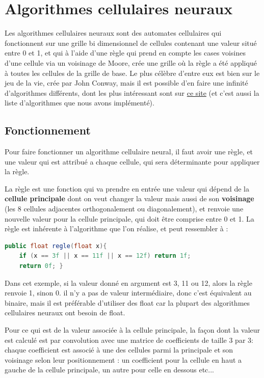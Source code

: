 \section{Algorithmes cellulaires neuraux}

\par Les algorithmes cellulaires neuraux sont des automates cellulaires qui fonctionnent sur une grille bi dimensionnel de cellules contenant une valeur situé entre 0 et 1, et qui à l'aide d'une règle qui prend en compte les cases voisines d'une cellule via un voisinage de Moore, crée une grille où la règle a été appliqué à toutes les cellules de la grille de base. Le plus célèbre d'entre eux est bien sur le jeu de la vie, crée par John Conway, mais il est possible d'en faire une infinité d'algorithmes différents, dont les plus intéressant sont sur \href{https://neuralpatterns.io/}{ce site} (et c'est aussi la liste d'algorithmes que nous avons implémenté). 

\subsection{Fonctionnement}

\par Pour faire fonctionner un algorithme cellulaire neural, il faut avoir une règle, et une valeur qui est attribué a chaque cellule, qui sera déterminante pour appliquer la règle.

\par La règle est une fonction qui va prendre en entrée une valeur qui dépend de la \textbf{cellule principale} dont on veut changer la valeur mais aussi de son \textbf{voisinage} (les 8 cellules adjacentes orthogonalement ou diagonalement), et renvoie une nouvelle valeur pour la cellule principale, qui doit être comprise entre 0 et 1. La règle est inhérente à l'algorithme que l'on réalise, et peut ressembler à :
\begin{lstlisting}[language=Java]
public float regle(float x){
    if (x == 3f || x == 11f || x == 12f) return 1f;
    return 0f; }
\end{lstlisting}

\par Dans cet exemple, si la valeur donné en argument est 3, 11 ou 12, alors la règle renvoie 1, sinon 0. il n'y a pas de valeur intermédiaire, donc c'est équivalent au binaire, mais il est préférable d'utiliser des float car la plupart des algorithmes cellulaires neuraux ont besoin de float.

\par Pour ce qui est de la valeur associée à la cellule principale, la façon dont la valeur est calculé est par convolution avec une matrice de coefficients de taille 3 par 3: chaque coefficient est associé à une des cellules parmi la principale et son voisinage selon leur positionnement : un coefficient pour la cellule en haut a gauche de la cellule principale, un autre pour celle en dessous etc...

